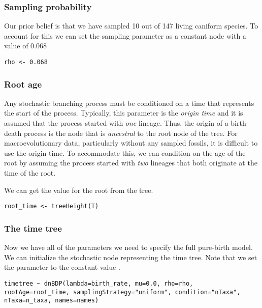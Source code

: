 \subsubsection{Sampling probability}

Our prior belief is that we have sampled 10 out of 147 living caniform species. 
To account for this we can set the sampling parameter as a constant node with a value of 0.068
{\tt \begin{snugshade*}
\begin{lstlisting}
rho <- 0.068
\end{lstlisting}
\end{snugshade*}}


\subsubsection{Root age}

Any stochastic branching process must be conditioned on a time that represents the start of the process. 
Typically, this parameter is the \textit{origin time} and it is assumed that the process started with \textit{one} lineage. 
Thus, the origin of a birth-death process is the node that is \textit{ancestral} to the root node of the tree.
For macroevolutionary data, particularly without any sampled fossils, it is difficult to use the origin time.
To accommodate this, we can condition on the age of the root by assuming the process started with \textit{two} lineages that both originate at the time of the root.

We can get the value for the root from the \citet{dosReis2012} tree.

{\tt \begin{snugshade*}
\begin{lstlisting}
root_time <- treeHeight(T)
\end{lstlisting}
\end{snugshade*}}

\subsubsection{The time tree}

Now we have all of the parameters we need to specify the full pure-birth model. 
We can initialize the stochastic node representing the time tree.
Note that we set the  parameter to the constant value .
{\tt \begin{snugshade*}
\begin{lstlisting}
timetree ~ dnBDP(lambda=birth_rate, mu=0.0, rho=rho, rootAge=root_time, samplingStrategy="uniform", condition="nTaxa", nTaxa=n_taxa, names=names)\end{lstlisting}
\end{snugshade*}}

